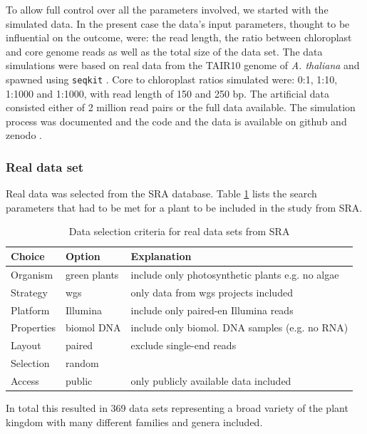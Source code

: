 To allow full control over all the parameters involved, we started with the simulated data.
In the present case the data's input parameters, thought to be influential on the outcome,
were: the read length, the ratio between chloroplast and core genome reads as well as the
total size of the data set. The data simulations were based on real data from the TAIR10
genome of \textit{A. thaliana} \cite{tair10} and spawned using \texttt{seqkit}
\cite{seqkit}. Core to chloroplast ratios simulated were: 0:1, 1:10, 1:1000 and 1:1000,
with read length of 150 and 250 bp. The artificial data consisted either of 2 million read
pairs or the full data available. The simulation process was documented and the code and
the data is available on github and zenodo \cite{zenododataset}.

\subsubsection{Real data set}\label{sec:cp_real}

Real data was selected from the SRA database. Table \ref{tab:sra_real} lists the search
parameters that had to be met for a plant to be included in the study from SRA.

\onehalfspacing
\begin{table}[H]
\caption{Data selection criteria for real data sets from SRA}
\label{tab:sra_real}
\centering
\begin{tabular}{lll}
  \toprule
  Choice & Option & Explanation \\
  \midrule
   Organism   & green plants & include only photosynthetic plants e.g. no algae  \\
   Strategy   & wgs          & only data from wgs projects included \\
   Platform   & Illumina     & include only paired-en Illumina reads \\
   Properties & biomol DNA   & include only biomol. DNA samples (e.g. no RNA) \\
   Layout     & paired       & exclude single-end reads  \\
   Selection  & random       & \\
   Access     & public       & only publicly available data included \\
  \bottomrule                                       
\end{tabular}
\end{table}
\doublespacing
\noindent
In total this resulted in 369 data sets representing a broad variety of the plant kingdom with many different
families and genera included.

